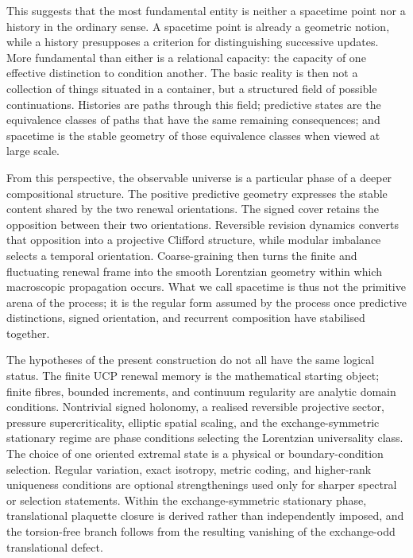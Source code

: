 \documentclass[11pt]{article}
\theoremstyle{definition}
\theoremstyle{remark}
\begin{document}
This suggests that the most fundamental entity is neither a spacetime point
nor a history in the ordinary sense.  A spacetime point is already a geometric
notion, while a history presupposes a criterion for distinguishing successive
updates.  More fundamental than either is a relational capacity: the capacity
of one effective distinction to condition another.  The basic reality is then
not a collection of things situated in a container, but a structured field of
possible continuations.  Histories are paths through this field; predictive
states are the equivalence classes of paths that have the same remaining
consequences; and spacetime is the stable geometry of those equivalence
classes when viewed at large scale.

From this perspective, the observable universe is a particular phase of a
deeper compositional structure.  The positive predictive geometry expresses
the stable content shared by the two renewal orientations.  The signed cover
retains the opposition between their two orientations.  Reversible revision
dynamics converts that opposition into a projective Clifford structure, while
modular imbalance selects a temporal orientation.  Coarse-graining then turns
the finite and fluctuating renewal frame into the smooth Lorentzian geometry
within which macroscopic propagation occurs.  What we call spacetime is thus
not the primitive arena of the process; it is the regular form assumed by the
process once predictive distinctions, signed orientation, and recurrent
composition have stabilised together.

The hypotheses of the present construction do not all have the same logical
status.  The finite UCP renewal memory is the mathematical starting object;
finite fibres, bounded increments, and continuum regularity are analytic
domain conditions.  Nontrivial signed holonomy, a realised reversible
projective sector, pressure supercriticality, elliptic spatial scaling, and
the exchange-symmetric stationary regime are phase conditions selecting the
Lorentzian universality class.  The choice of one oriented extremal state is
a physical or boundary-condition selection.  Regular variation, exact
isotropy, metric coding, and higher-rank uniqueness conditions are optional
strengthenings used only for sharper spectral or selection statements.
Within the exchange-symmetric stationary phase, translational plaquette
closure is derived rather than independently imposed, and the torsion-free
branch follows from the resulting vanishing of the exchange-odd
translational defect.
\end{document}
